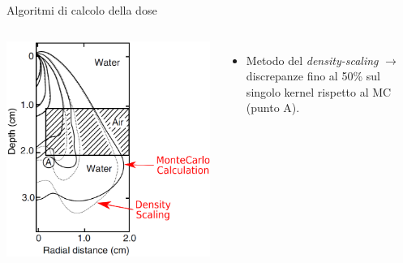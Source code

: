 \documentclass{beamer}
\begin{document}
\begin{frame}{Algoritmi di calcolo della dose}
\begin{columns}[t]
\includegraphics[width=\textwidth]{../cap1/kern_dens_pres.png}
\scriptsize
\begin{itemize}
\item Metodo del \textit{density-scaling} $\rightarrow$ discrepanze fino al 50\% sul singolo kernel rispetto al MC (punto A).
\end{itemize}
\end{columns}
\end{frame}
\end{document}
